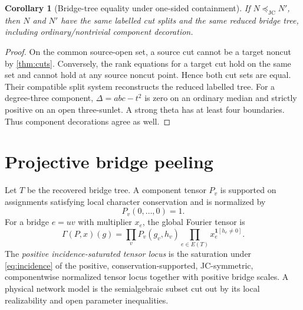 \documentclass[11pt]{article}
\newtheorem{corollary}[theorem]{Corollary}
\theoremstyle{remark}
\newcommand{\JC}{\mathrm{JC}}
\newcommand{\preceqjc}{\preceq_{\!\JC}}
\begin{document}
\begin{corollary}[Bridge-tree equality under one-sided containment]
\label{cor:bridge-tree}
If $N\preceqjc N'$, then $N$ and $N'$ have the same labelled cut splits and
the same reduced bridge tree, including ordinary/nontrivial component
decoration.
\end{corollary}

\begin{proof}
On the common source-open set, a source cut cannot be a target noncut by
\cref{thm:cuts}.  Conversely, the rank equations for a target cut hold on the
same set and cannot hold at any source noncut point.  Hence both cut sets are
equal.  Their compatible split system reconstructs the reduced labelled
tree.  For a degree-three component, $\Delta=abc-t^2$ is zero on an ordinary
median and strictly positive on an open three-sunlet.  A strong theta has at
least four boundaries.  Thus component decorations agree as well.
\end{proof}

\section{Projective bridge peeling}\label{sec:bridge}

Let $T$ be the recovered bridge tree.  A component tensor $P_v$ is supported
on assignments satisfying local character conservation and is normalized by
\[
P_v(0,\ldots,0)=1.
\]
For a bridge
$e=uv$ with multiplier $x_e$, the global Fourier tensor is
\begin{equation}\label{eq:bridge-product}
\Gamma(P,x)(g)=\prod_v P_v(g_v,h_v)
\prod_{e\in E(T)}x_e^{\mathbf1[h_e\ne0]}.
\end{equation}
The \emph{positive incidence-saturated tensor locus} is the saturation under
\eqref{eq:incidence} of the positive, conservation-supported, JC-symmetric,
componentwise normalized tensor locus together with positive bridge scales.
A physical network model is
the semialgebraic subset cut out by its local realizability and open
parameter inequalities.


\end{document}
